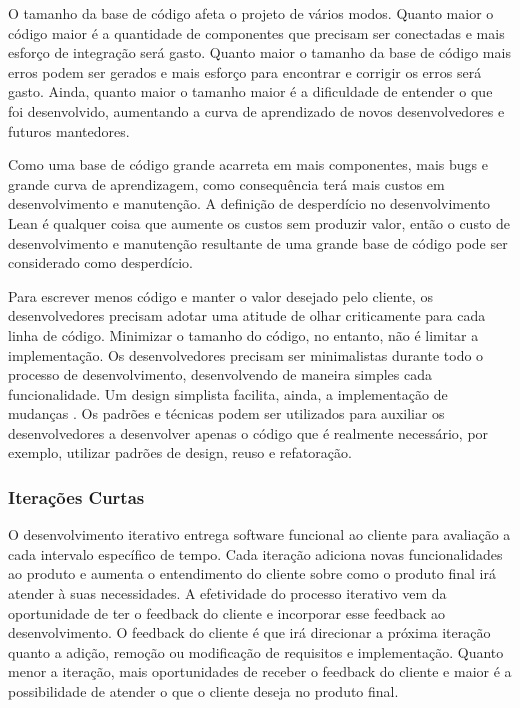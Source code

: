 O tamanho da base de código afeta o projeto de vários modos. Quanto maior o código maior é a quantidade de componentes que precisam ser conectadas e mais esforço de integração será gasto. Quanto maior o tamanho da base de código mais erros podem ser gerados e mais esforço para encontrar e corrigir os erros será gasto. Ainda, quanto maior o tamanho maior é a dificuldade de entender o que foi desenvolvido, aumentando a curva de aprendizado de novos desenvolvedores e futuros mantedores.  

Como uma base de código grande acarreta em mais componentes, mais bugs e grande curva de aprendizagem, como consequência terá mais custos em desenvolvimento e manutenção. A definição de desperdício no desenvolvimento Lean é qualquer coisa que aumente os custos sem produzir valor, então o custo de desenvolvimento e manutenção resultante de uma grande base de código pode ser considerado como desperdício. 

Para escrever menos código e manter o valor desejado pelo cliente, os desenvolvedores precisam adotar uma atitude de olhar criticamente para cada linha de código. Minimizar o tamanho do código, no entanto, não é limitar a implementação. Os desenvolvedores precisam ser minimalistas durante todo o processo de desenvolvimento, desenvolvendo de maneira simples cada funcionalidade. Um design simplista facilita, ainda, a implementação de mudanças \cite{hibbs2009}. Os padrões e técnicas podem ser utilizados para auxiliar os desenvolvedores a desenvolver apenas o código que é realmente necessário, por exemplo, utilizar padrões de design, reuso e refatoração.

\subsubsection[Iterações Curtas]{Iterações Curtas}

O desenvolvimento iterativo entrega software funcional ao cliente para avaliação a cada intervalo específico de tempo. Cada iteração adiciona novas funcionalidades ao produto e aumenta o entendimento do cliente sobre como o produto final irá atender à suas necessidades. A efetividade do processo iterativo vem da oportunidade de ter o feedback do cliente e incorporar esse feedback ao desenvolvimento. O feedback do cliente é que irá direcionar a próxima iteração quanto a adição, remoção ou modificação de requisitos e implementação. Quanto menor a iteração, mais oportunidades de receber o feedback do cliente e maior é a possibilidade de atender o que o cliente deseja no produto final. 

